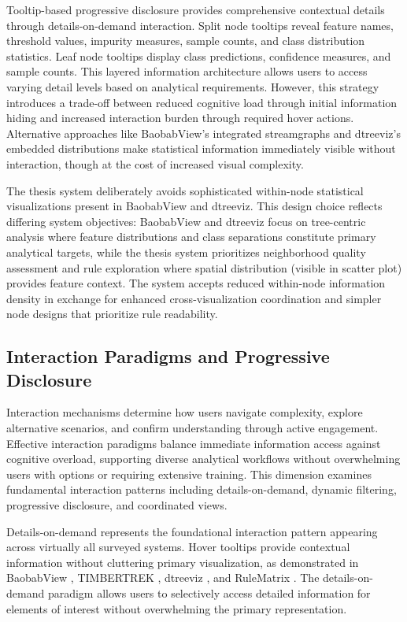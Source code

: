 Tooltip-based progressive disclosure provides comprehensive contextual details through details-on-demand interaction. Split node tooltips reveal feature names, threshold values, impurity measures, sample counts, and class distribution statistics. Leaf node tooltips display class predictions, confidence measures, and sample counts. This layered information architecture allows users to access varying detail levels based on analytical requirements. However, this strategy introduces a trade-off between reduced cognitive load through initial information hiding and increased interaction burden through required hover actions. Alternative approaches like BaobabView's integrated streamgraphs \cite{elzen2011baobabview} and dtreeviz's embedded distributions \cite{parr2019dtreeviz} make statistical information immediately visible without interaction, though at the cost of increased visual complexity.

The thesis system deliberately avoids sophisticated within-node statistical visualizations present in BaobabView and dtreeviz. This design choice reflects differing system objectives: BaobabView and dtreeviz focus on tree-centric analysis where feature distributions and class separations constitute primary analytical targets, while the thesis system prioritizes neighborhood quality assessment and rule exploration where spatial distribution (visible in scatter plot) provides feature context. The system accepts reduced within-node information density in exchange for enhanced cross-visualization coordination and simpler node designs that prioritize rule readability.

\subsection{Interaction Paradigms and Progressive Disclosure}

Interaction mechanisms determine how users navigate complexity, explore alternative scenarios, and confirm understanding through active engagement. Effective interaction paradigms balance immediate information access against cognitive overload, supporting diverse analytical workflows without overwhelming users with options or requiring extensive training. This dimension examines fundamental interaction patterns including details-on-demand, dynamic filtering, progressive disclosure, and coordinated views.

Details-on-demand represents the foundational interaction pattern appearing across virtually all surveyed systems. Hover tooltips provide contextual information without cluttering primary visualization, as demonstrated in BaobabView \cite{elzen2011baobabview}, TIMBERTREK \cite{wang2022timbertrek}, dtreeviz \cite{parr2019dtreeviz}, and RuleMatrix \cite{ming2019rulematrix}. The details-on-demand paradigm \cite{readingsInformationVi} allows users to selectively access detailed information for elements of interest without overwhelming the primary representation.

